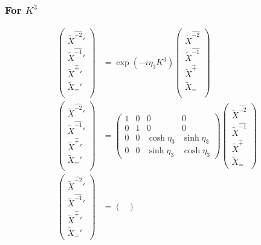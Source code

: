 \documentclass[]{article}
\numberwithin{equation}{section}
\begin{document}
{{\subsubsection{For $K^{3}$}
\begin{align}
\begin{pmatrix}
    \tilde{X}^{\hat{-2}}'\\
    \tilde{X}^{\hat{-1}}'\\
    \tilde{X}^{\hat{+}}'\\
    \tilde{X}_{\hat{-}}'\\
    \end{pmatrix}&= \exp{(-i\eta_{3}K^{3})}\begin{pmatrix}
    \tilde{X}^{\hat{-2}}\\
    \tilde{X}^{\hat{-1}}\\
    \tilde{X}^{\hat{+}}\\
    \tilde{X}_{\hat{-}}\\
    \end{pmatrix}\\
    \begin{pmatrix}
    \tilde{X}^{\hat{-2}}'\\
    \tilde{X}^{\hat{-1}}'\\
    \tilde{X}^{\hat{+}}'\\
    \tilde{X}_{\hat{-}}'\\
    \end{pmatrix}&= \begin{pmatrix}
        1&0&0&0\\
        0&1&0&0\\
        0&0&\cosh{\eta_{3}}&\sinh{\eta_{3}}\\
        0&0&\sinh{\eta_{3}}&\cosh{\eta_{3}}
    \end{pmatrix}\begin{pmatrix}
    \tilde{X}^{\hat{-2}}\\
    \tilde{X}^{\hat{-1}}\\
    \tilde{X}^{\hat{+}}\\
    \tilde{X}_{\hat{-}}
    \end{pmatrix}\\
    \begin{pmatrix}
    \tilde{X}^{\hat{-2}}'\\
    \tilde{X}^{\hat{-1}}'\\
    \tilde{X}^{\hat{+}}'\\
    \tilde{X}_{\hat{-}}'
    \end{pmatrix}&= \begin{pmatrix}

\end{pmatrix}
\end{align}}}
\end{document}
